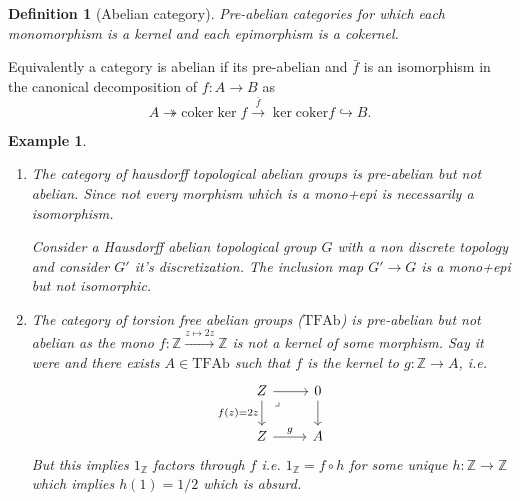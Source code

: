 \documentclass[12pt]{article}
\numberwithin{equation}{section}
\newcommand{\Z}{\mathbb{Z}}
\newcommand{\coker}{{\mathrm{coker}}}
\newcounter{dummy} \numberwithin{dummy}{section}
\newtheorem{definition}[dummy]{Definition}
\newtheorem{example}[dummy]{Example}
\begin{document}
	
	\begin{definition}[Abelian category]
		Pre-abelian categories for which each monomorphism is a kernel and each epimorphism is a cokernel.
	\end{definition}
	Equivalently a category is abelian if its pre-abelian and $\bar{f}$ is an isomorphism in the canonical decomposition of $f:A\to B$ as $$A \twoheadrightarrow \coker \ker f \xrightarrow{\bar{f}} \ker \coker f  \hookrightarrow B.$$
	\begin{example}\label{expreabnotab}
		
		\begin{enumerate}Some non examples are:
			\item The category of hausdorff topological abelian groups is pre-abelian but not abelian. Since not every morphism which is a mono+epi is necessarily a isomorphism. 
			
			Consider a Hausdorff abelian topological group $G$ with a non discrete topology and consider $G'$ it's discretization. The inclusion map $G' \to G$ is a mono+epi but not isomorphic. 
			\item The category of torsion free abelian groups ($\mathrm{TFAb}$) is pre-abelian but not abelian as the mono $f: \Z \xrightarrow{z\mapsto 2z} \Z $ is not a kernel of some morphism. Say it were and there exists $ A \in \mathrm{TFAb}$ such that $f$ is the kernel to $ g: \Z \to A$, i.e.
			\[\begin{tikzcd}
				Z & 0 \\
				Z & A
				\arrow[from=1-1, to=1-2]
				\arrow["{f(z)=2z}"', from=1-1, to=2-1]
				\arrow["\lrcorner"{anchor=center, pos=0.125}, draw=none, from=1-1, to=2-2]
				\arrow[from=1-2, to=2-2]
				\arrow["g", from=2-1, to=2-2]
			\end{tikzcd}\]
			But this implies $1_\Z$ factors through $f$ i.e. $1_\Z =f\circ h$ for some unique $h:\Z \to \Z $ which implies $h(1)=1/2$ which is absurd.
		\end{enumerate}
		
	\end{example}
\end{document}
